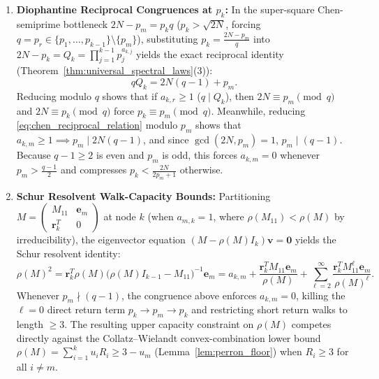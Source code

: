\documentclass[11pt,a4paper]{article}
\theoremstyle{definition}
\begin{document}
\begin{enumerate}
    \item \textbf{Diophantine Reciprocal Congruences at $p_k$:}  
    In the super-square Chen-semiprime bottleneck $2N - p_m = p_k q$ ($p_k > \sqrt{2N}$, forcing $q = p_r \in \{p_1, \dots, p_{k-1}\} \setminus \{p_m\}$), substituting $p_k = \frac{2N - p_m}{q}$ into $2N - p_k = Q_k = \prod_{j=1}^{k-1} p_j^{a_{k,j}}$ yields the exact reciprocal identity (Theorem~\ref{thm:universal_spectral_laws}(3)):
    \begin{equation}
    \label{eq:chen_reciprocal_relation}
    q Q_k = 2N(q - 1) + p_m.
    \end{equation}
    Reducing modulo $q$ shows that if $a_{k,r} \ge 1$ ($q \mid Q_k$), then $2N \equiv p_m \pmod q$ and $2N \equiv p_k \pmod q$ force $p_k \equiv p_m \pmod q$. Meanwhile, reducing \eqref{eq:chen_reciprocal_relation} modulo $p_m$ shows that $a_{k,m} \ge 1 \implies p_m \mid 2N(q - 1)$, and since $\gcd(2N, p_m) = 1$, $p_m \mid (q - 1)$. Because $q - 1 \ge 2$ is even and $p_m$ is odd, this forces $a_{k,m} = 0$ whenever $p_m > \frac{q-1}{2}$ and compresses $p_k < \frac{2N}{2p_m + 1}$ otherwise.

    \item \textbf{Schur Resolvent Walk-Capacity Bounds:}  
    Partitioning $M = \begin{pmatrix} M_{11} & \mathbf{e}_m \\ \mathbf{r}_k^T & 0 \end{pmatrix}$ at node $k$ (when $a_{m,k} = 1$, where $\rho(M_{11}) < \rho(M)$ by irreducibility), the eigenvector equation $(M - \rho(M)I_k)\mathbf{v} = \mathbf{0}$ yields the Schur resolvent identity:
    \begin{equation}
    \label{eq:schur_resolvent_series}
    \rho(M)^2 = \mathbf{r}_k^T \rho(M)\bigl(\rho(M) I_{k-1} - M_{11}\bigr)^{-1} \mathbf{e}_m = a_{k,m} + \frac{\mathbf{r}_k^T M_{11} \mathbf{e}_m}{\rho(M)} + \sum_{\ell=2}^\infty \frac{\mathbf{r}_k^T M_{11}^\ell \mathbf{e}_m}{\rho(M)^\ell}.
    \end{equation}
    Whenever $p_m \nmid (q - 1)$, the congruence above enforces $a_{k,m} = 0$, killing the $\ell = 0$ direct return term $p_k \to p_m \to p_k$ and restricting short return walks to length $\ge 3$. The resulting upper capacity constraint on $\rho(M)$ competes directly against the Collatz--Wielandt convex-combination lower bound $\rho(M) = \sum_{i=1}^k u_i R_i \ge 3 - u_m$ (Lemma~\ref{lem:perron_floor}) when $R_i \ge 3$ for all $i \ne m$.


\end{enumerate}
\end{document}
